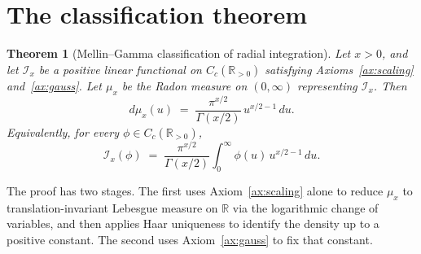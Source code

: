\documentclass[11pt,a4paper]{article}
\theoremstyle{plain}
\newtheorem{theorem}{Theorem}[section]
\theoremstyle{definition}
\theoremstyle{remark}
\newcommand{\R}{\mathbb{R}}
\newcommand{\Cc}{C_c}
\newcommand{\Iop}{\mathcal{I}}
\begin{document}
\section{The classification theorem}\label{sec:classification}

\begin{theorem}[Mellin--Gamma classification of radial integration]\label{thm:classification}
Let $x>0$, and let $\Iop_x$ be a positive linear functional on $\Cc(\R_{>0})$ satisfying Axioms~\ref{ax:scaling} and~\ref{ax:gauss}. Let $\mu_x$ be the Radon measure on $(0,\infty)$ representing $\Iop_x$. Then
\[
d\mu_x(u) \;=\; \frac{\pi^{x/2}}{\Gamma(x/2)}\,u^{x/2-1}\,du.
\]
Equivalently, for every $\phi\in\Cc(\R_{>0})$,
\[
\Iop_x(\phi) \;=\; \frac{\pi^{x/2}}{\Gamma(x/2)}\int_0^\infty \phi(u)\,u^{x/2-1}\,du.
\]
\end{theorem}

The proof has two stages. The first uses Axiom~\ref{ax:scaling} alone to reduce $\mu_x$ to translation-invariant Lebesgue measure on $\R$ via the logarithmic change of variables, and then applies Haar uniqueness to identify the density up to a positive constant. The second uses Axiom~\ref{ax:gauss} to fix that constant.
\end{document}
